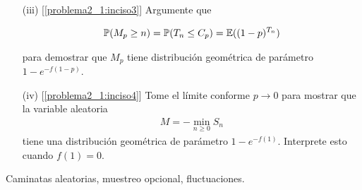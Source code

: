 \begin{problema}
\begin{enumerate}
                    \begin{align}
                        T_k =\min \{n\in\na:S_n=-k\} 
                    \end{align}
                    
                    (donde se utiliza la convenci\'on $\inf\emptyset=\infty$ ). Aplique el teorema de muestreo opcional de Doob para mostrar que 
                    
                    \begin{align}
                        E(s^{T_k})=e^{-k f(s)}.
                    \end{align}
                    
                    Justifique MUY bien por qu\'e la f\'ormula es válida aún cuando $T_k$ puede tomar el valor $\infty$ 
                    y deduzca que de hecho $\p (T_k=\infty)=0$.
                        
        \item[(iii)] [\ref{problema2_1:inciso3}]
                    Argumente que
        
                    \begin{align}
                        \mathbb{P}(M_p\geq n)=\mathbb{P}(T_n\leq C_p)=\mathbb{E}((1-p)^{T_n})
                    \end{align}
                    
                    para demostrar que $M_p$ tiene distribuci\'on geom\'etrica de par\'ametro $1-e^{-f(1-p)}$.
                    
        \item[(iv)] [\ref{problema2_1:inciso4}]
                    Tome el límite conforme $p\to 0$ para mostrar que la variable aleatoria 
                    \begin{align}
                        M=-\min_{n\geq 0}S_n
                    \end{align}
                    tiene una distribuci\'on geom\'etrica de par\'ametro $1-e^{-f(1)}$. Interprete esto cuando $f(1)=0$.
    \end{enumerate}

         Caminatas aleatorias, muestreo opcional, fluctuaciones.
\end{problema}


